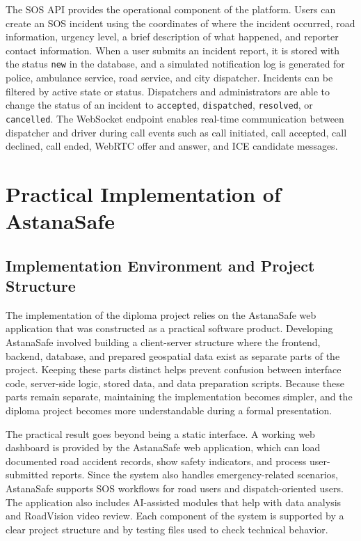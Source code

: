 ﻿\documentclass[12pt,a4paper]{report}
\begin{document}
The SOS API provides the operational component of the platform. Users can create an SOS incident using the coordinates of where the incident occurred, road information, urgency level, a brief description of what happened, and reporter contact information. When a user submits an incident report, it is stored with the status \texttt{new} in the database, and a simulated notification log is generated for police, ambulance service, road service, and city dispatcher. Incidents can be filtered by active state or status. Dispatchers and administrators are able to change the status of an incident to \texttt{accepted}, \texttt{dispatched}, \texttt{resolved}, or \texttt{cancelled}. The WebSocket endpoint enables real-time communication between dispatcher and driver during call events such as call initiated, call accepted, call declined, call ended, WebRTC offer and answer, and ICE candidate messages.

\chapter{Practical Implementation of AstanaSafe}

\section{Implementation Environment and Project Structure}

The implementation of the diploma project relies on the AstanaSafe web application that was constructed as a practical software product. Developing AstanaSafe involved building a client-server structure where the frontend, backend, database, and prepared geospatial data exist as separate parts of the project. Keeping these parts distinct helps prevent confusion between interface code, server-side logic, stored data, and data preparation scripts. Because these parts remain separate, maintaining the implementation becomes simpler, and the diploma project becomes more understandable during a formal presentation.

The practical result goes beyond being a static interface. A working web dashboard is provided by the AstanaSafe web application, which can load documented road accident records, show safety indicators, and process user-submitted reports. Since the system also handles emergency-related scenarios, AstanaSafe supports SOS workflows for road users and dispatch-oriented users. The application also includes AI-assisted modules that help with data analysis and RoadVision video review. Each component of the system is supported by a clear project structure and by testing files used to check technical behavior.
\end{document}
